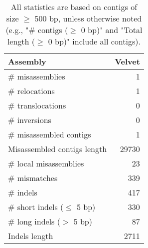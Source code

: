 \documentclass[12pt,a4paper]{article}
\begin{document}
\begin{table}[ht]
\begin{center}
\caption{All statistics are based on contigs of size $\geq$ 500 bp, unless otherwise noted (e.g., "\# contigs ($\geq$ 0 bp)" and "Total length ($\geq$ 0 bp)" include all contigs).}
\begin{tabular}{|l*{1}{|r}|}
\hline
Assembly & Velvet \\ \hline
\# misassemblies & 1 \\ \hline
\hspace{5mm}\# relocations & 1 \\ \hline
\hspace{5mm}\# translocations & 0 \\ \hline
\hspace{5mm}\# inversions & 0 \\ \hline
\# misassembled contigs & 1 \\ \hline
Misassembled contigs length & 29730 \\ \hline
\# local misassemblies & 23 \\ \hline
\# mismatches & 339 \\ \hline
\# indels & 417 \\ \hline
\hspace{5mm}\# short indels ($\leq$ 5 bp) & 330 \\ \hline
\hspace{5mm}\# long indels ($>$ 5 bp) & 87 \\ \hline
Indels length & 2711 \\ \hline
\end{tabular}
\end{center}
\end{table}
\end{document}
